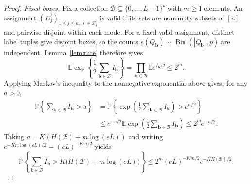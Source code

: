 \documentclass[11pt,reqno]{amsart}
\numberwithin{equation}{section}
\theoremstyle{definition}
\theoremstyle{remark}
\newcommand{\E}{\mathbb E}
\newcommand{\Pp}{\mathbb P}
\begin{document}
\begin{proof}
\emph{Fixed boxes.}
Fix a collection $\mathcal B\subseteq\{0,\ldots,L-1\}^k$ with $m\ge1$ elements.
An assignment $(D_j^\ell)_{1\le j\le k,\,\ell\in\mathcal B_j}$ is valid
if its sets are nonempty subsets of $[n]$ and pairwise disjoint within each mode.
For a fixed valid assignment, distinct label tuples give disjoint boxes,
so the counts $e(Q_{\mathbf{b}})\sim\operatorname{Bin}(|Q_{\mathbf{b}}|,p)$ are independent.
Lemma~\ref{lem:rate} therefore gives
\[
 \E\exp\left\{\frac12\sum_{\mathbf{b}\in\mathcal B}I_{\mathbf{b}}\right\}
 =\prod_{\mathbf{b}\in\mathcal B}\E e^{I_{\mathbf{b}}/2}\le2^m.
\]
 Applying Markov's
inequality to the nonnegative exponential above gives, for any $a>0$,
\begin{align*}
 \Pp\left\{\sum_{\mathbf{b}\in\mathcal B}I_{\mathbf{b}}>a\right\}
 &=\Pp\left\{\exp\left(\frac12\sum_{\mathbf{b}\in\mathcal B}I_{\mathbf{b}}\right)
                    >e^{a/2}\right\}\\
 &\le e^{-a/2}\E\exp\left(\frac12\sum_{\mathbf{b}\in\mathcal B}I_{\mathbf{b}}\right)
 \le2^m e^{-a/2}.
\end{align*}
Taking $a=K(H(\mathcal B)+m\log(eL))$ and writing
$e^{-Km\log(eL)/2}=(eL)^{-Km/2}$ yields
\begin{equation}\label{eq:fixed-budget-tail}
 \Pp\left\{\sum_{\mathbf{b}\in\mathcal B}I_{\mathbf{b}}>
       K\bigl(H(\mathcal B)+m\log(eL)\bigr)\right\}
 \le2^m(eL)^{-Km/2}e^{-KH(\mathcal B)/2}.
\end{equation}



\end{proof}
\end{document}
